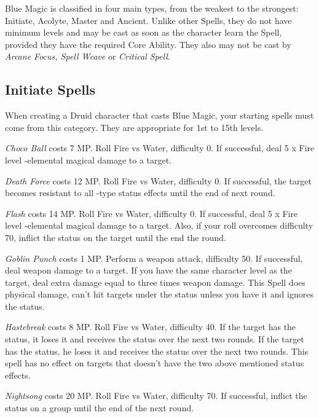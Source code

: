 \begin{multicols}{2}

Blue Magic is classified in four main types, from the weakest to the strongest: Initiate, Acolyte, Master and Ancient. Unlike other Spells, they do not have minimum levels and may be cast as soon as the character learn the Spell, provided they have the required Core Ability. They also may not be cast by \textit{Arcane Focus, Spell Weave} or \textit{Critical Spell}.
 
\subsection{Initiate Spells}\label{subsec:blue-initiate}
	When creating a Druid character that casts Blue Magic, your starting spells must come from this category. They are appropriate for 1st to 15th levels.

    \textit{Choco Ball} costs 7 MP\@. Roll Fire vs Water, difficulty 0. If successful, deal 5 x Fire level -elemental magical damage to a target.

    \textit{Death Force} costs 12 MP\@. Roll Fire vs Water, difficulty 0. If successful, the target becomes resistant to all -type status effects until the end of next round.

	\textit{Flash} costs 14 MP\@. Roll Fire vs Water, difficulty 0. If successful, deal 5 x Fire level -elemental magical damage to a target. Also, if your roll overcomes difficulty 70, inflict the  status on the target until the end the round.
	
    \textit{Goblin Punch} costs 1 MP\@. Perform a weapon attack, difficulty 50. If successful, deal weapon damage to a target. If you have the same character level as the target, deal extra damage equal to three times weapon damage. This Spell does physical damage, can’t hit targets under the  status unless you have it and ignores the  status.

    \textit{Hastebreak} costs 8 MP\@. Roll Fire vs Water, difficulty 40. If the target has the  status, it loses it and receives the  status over the next two rounds. If the target has the  status, he loses it and receives the  status over the next two rounds. This spell has no effect on targets that doesn’t have the two above mentioned status effects.
    
    \textit{Nightsong} costs 20 MP\@. Roll Fire vs Water, difficulty 70. If successful, inflict the  status on a group until the end of the next round.
    

\end{multicols}
